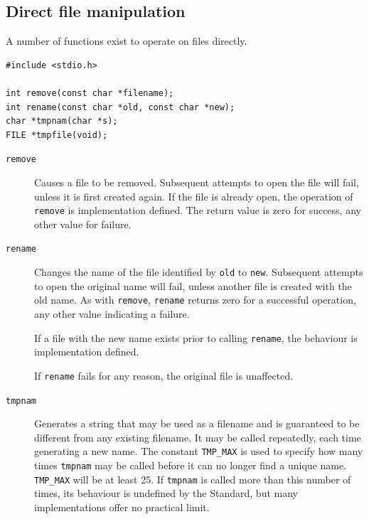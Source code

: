    

  

  \subsection{Direct file manipulation}
   

   A number of functions exist to operate on files directly.


   \begin{Verbatim}
#include <stdio.h>

int remove(const char *filename);
int rename(const char *old, const char *new);
char *tmpnam(char *s);
FILE *tmpfile(void);
\end{Verbatim}

   \begin{description}
    \item[\texttt{remove}] Causes a file to be removed. Subsequent attempts to  open
     the file will fail, unless it is first created again.  If
     the file is already open,  the  operation  of  \texttt{remove}  is
     implementation  defined.  The  return  value  is zero for
     success, any other value for failure.

    \item[\texttt{rename}] 
     Changes the name of the file identified by  \texttt{old}  to
      \texttt{new}.
      Subsequent  attempts to open the original name will fail,
      unless another file is created with  the  old  name.   As
      with \texttt{remove}, \texttt{rename} returns zero for a
      successful operation, any other value indicating a failure.


     If a file with the  new  name  exists  prior  to  calling
      \texttt{rename}, the behaviour is implementation defined.


     If \texttt{rename} fails for any  reason,  the  original  file  is
      unaffected.

    

    \item[\texttt{tmpnam}] 
     Generates a string that may be used as a filename and  is
      guaranteed  to  be  different from any existing filename.
      It may be called repeatedly, each time generating  a  new
      name.  The  constant  \texttt{TMP\_MAX} is used to specify how many
      times \texttt{tmpnam} may be called before it can no longer find a
      unique  name.  \texttt{TMP\_MAX} will be at least 25.  If
      \texttt{tmpnam} is
      called more than this number of times, its  behaviour  is
      undefined by the Standard, but many implementations offer
      no practical limit.



\end{description}
